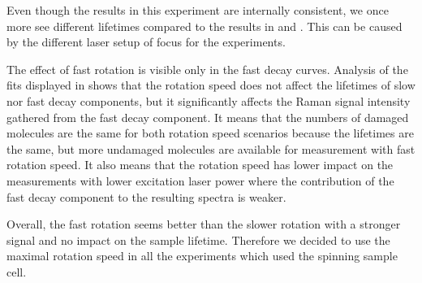 \begin{table}
	\centering
	
	\caption[%
		Lifetimes of slow and fast decay components of the polyU in
		dependence on rotation frequency.%
	]{%
		$E_0$ are total energies accumulated by the detector divided by the maximal
		value across all the excitation powers $P$, and $E$ are energies
		accumulated from the time $T = 60\pm20$\,s needed for the adjustment of the
		samples before the acquisition can even start, but the sample needs to be
		irradiated by the excitation laser.
		The last column contains fractions of the samples $r$ that were not
		destroyed by photodecomposition after the time $T$.
	}
	\label{\tablabel{rotation_optim:lifetimes}}
\end{table}

Even though the results in this experiment are internally consistent, we once
more see different lifetimes compared to the results in
and
.
This can be caused by the different laser setup of focus for the experiments.

The effect of fast rotation is visible only in the fast decay curves.
Analysis of the fits displayed in
shows that the rotation speed does not affect the lifetimes of slow nor fast
decay components, but it significantly affects the Raman signal intensity
gathered from the fast decay component.
It means that the numbers of damaged molecules are the same for both rotation
speed scenarios because the lifetimes are the same, but more undamaged
molecules are available for measurement with fast rotation speed.
It also means that the rotation speed has lower impact on the measurements
with lower excitation laser power where the contribution of the fast decay
component to the resulting spectra is weaker.

Overall, the fast rotation seems better than the slower rotation with a
stronger signal and no impact on the sample lifetime.
Therefore we decided to use the maximal rotation speed in all the experiments
which used the spinning sample cell.
